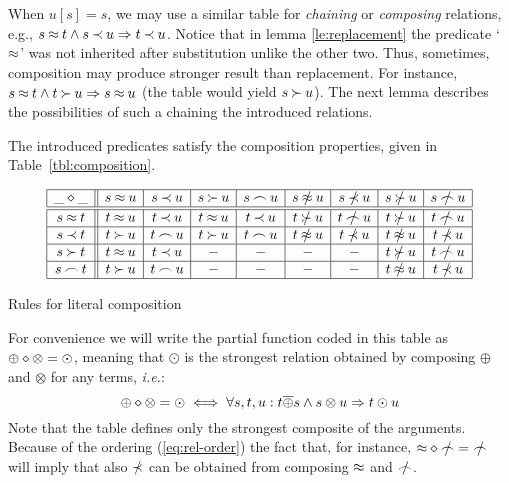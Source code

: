 When $u[s]=s$, we may use a similar table for {\em chaining} or {\em composing}
relations, e.g., $s\mathbin{\approx} t\land s\mathbin{\prec} u \mathrel\Rightarrow t\mathbin{\prec} u$. 
Notice that in lemma \ref{le:replacement} the predicate `$\mathbin{\approx}$'
was not inherited after substitution unlike the other two. Thus,
sometimes, composition may produce stronger result than replacement.
For instance, \(s\mathbin{\approx} t\land t\mathbin{\succ} u\mathrel\Rightarrow s\mathbin{\approx} u\)
(the table would yield $s\mathbin{\succ} u$).
The next lemma describes the possibilities of such a chaining the introduced relations.  
%
\begin{LEMMA} \label{le:composition}
The introduced predicates satisfy the composition properties, giv\-en in
Table~\ref {tbl:composition}.\vspace{-2ex}
\begin{table}[hbt]\MyLPar
\[\begin{array}{|c||c|c|c|c|c|c|c|c|}
\hline
\Comp\_\_        & s\Eq u   & s\Incl u & s\Cont u & s\Int u  
& s\notEq u   & s\notIncl u & s\notCont u & s\notInt u\\
\hline \hline
s\Eq t    & t\Eq u   & t\Incl u & t\Eq u   & t\Incl u 
& t\notCont u & t\notInt u  & t\notCont u & t\notInt u\\
\hline 
s\Incl t  & t\Cont u & t\Int u  & t\Cont u & t\Int u  
& t\notEq u   & t\notIncl u & t\notEq u   & t\notIncl u \\
\hline 
s\Cont t  & t\Eq u   & t\Incl u & -        & -        
& -           &    -        & t\notCont u & t\notInt u\\
\hline 
s\Int t   & t\Cont u & t\Int u  & -        & -        
& -           &    -        & t\notEq u   & t\notIncl u\\
\hline 
\end{array}\]\MyLPar
\caption{Rules for literal composition} \label{tbl:composition}\vspace{-1ex}
\end{table}
\end{LEMMA}
%
For convenience we will write the
partial function coded in this table as \(\oplus\diamond\otimes=\odot\), meaning
that $\odot$ is the strongest relation obtained by composing \(\oplus\) and
\(\otimes\) for any terms, {\em i.e.}:
\[\oplus\diamond\otimes=\odot\iff\forall s,t,u: t\overline{\oplus} s\land s\otimes u\mathrel\Rightarrow t\odot u\] 
Note that the table defines only the strongest
composite of the arguments. Because of the ordering (\ref{eq:rel-order}) 
the fact that, for instance, \(\Comp\Eq\notInt=\notInt\)
will imply that also \(\notIncl\) can be obtained from composing \(\mathbin{\approx}\) and 
\(\notInt\).

